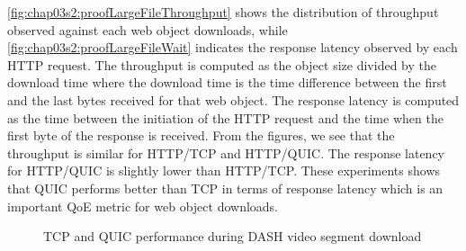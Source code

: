 \fig\ref{fig:chap03s2:proofLargeFileThroughput} shows the distribution of throughput observed against each web object downloads, while \fig\ref{fig:chap03s2:proofLargeFileWait} indicates the response latency observed by each HTTP request. The throughput is computed as the object size divided by the download time where the download time is the time difference between the first and the last bytes received for that web object. The response latency is computed as the time between the initiation of the HTTP request and the time when the first byte of the response is received. From the figures, we see that the throughput is similar for HTTP/TCP and HTTP/QUIC. The response latency for HTTP/QUIC is slightly lower than HTTP/TCP. These experiments shows that QUIC performs better than TCP in terms of response latency which is an important QoE metric for web object downloads. 


\begin{figure}[!ht]
	\captionsetup[subfigure]{}
	\begin{center}
		\hfill
	\end{center}
	\caption{\label{fig:chap03s2:dashcomp}TCP and QUIC performance during DASH video segment download}
\end{figure}


